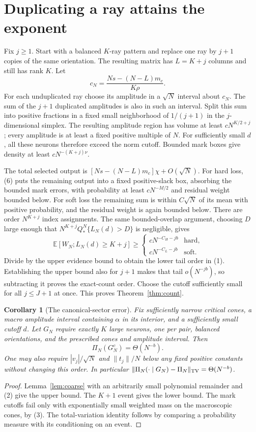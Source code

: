 \documentclass[11pt]{article}
\newtheorem{corollary}[theorem]{Corollary}
\newcommand{\E}{\mathbb E}\newcommand{\Pp}{\mathbb P}
\begin{document}
\section{Duplicating a ray attains the exponent}
Fix $j\ge1$. Start with a balanced $K$-ray pattern and replace one ray
by $j+1$ copies of the same orientation. The resulting matrix has
$L=K+j$ columns and still has rank $K$. Let
\[
                       c_N=\frac{Ns-(N-L)m_c}{K\rho}.
\]
For each unduplicated ray choose its amplitude in a $\sqrt N$ interval
about $c_N$. The sum of the $j+1$ duplicated amplitudes is also in such
an interval. Split this sum into positive fractions in a fixed small
neighborhood of $1/(j+1)$ in the $j$-dimensional simplex. The resulting
amplitude region has volume at least $cN^{K/2+j}$; every amplitude is
at least a fixed positive multiple of $N$. For sufficiently small $d$,
all these neurons therefore exceed the norm cutoff. Bounded mark boxes
give density at least $cN^{-(K+j)\nu}$.

The total selected output is $[Ns-(N-L)m_c]\chi+O(\sqrt N)$.
For hard loss, (6) puts the remaining output into a fixed positive-slack
box, absorbing the bounded mark errors, with probability at least
$cN^{-M/2}$ and residual weight bounded below. For soft loss the
remaining sum is within $C\sqrt N$ of its mean with positive probability,
and the residual weight is again bounded below. There are order
$N^{K+j}$ index assignments. The same bounded-overlap argument, choosing
$D$ large enough that $N^{K+j}Q_*^N\{L_N(d)>D\}$ is negligible, gives
\[
 \E[W_N;L_N(d)\ge K+j]\ge
 \begin{cases}cN^{-C_H-jb}&\text{hard},\\cN^{-C_L-jb}&\text{soft}.
 \end{cases}                                             \tag{14}
\]
Divide by the upper evidence bound to obtain the lower tail order in
(1). Establishing the upper bound also for $j+1$ makes that tail
$o(N^{-jb})$, so subtracting it proves the exact-count order. Choose
the cutoff sufficiently small for all $j\le J+1$ at once. This proves
Theorem~\ref{thm:count}.

\begin{corollary}[The canonical-sector error]\label{cor:sector}
Fix sufficiently narrow critical cones, a macro amplitude interval
containing $\alpha$ in its interior, and a sufficiently small cutoff $d$.
Let $G_N$ require exactly $K$ large neurons, one per pair, balanced
orientations, and the prescribed cones and amplitude interval. Then
\[
                         \Pi_N(G_N^c)=\Theta(N^{-b}).     \tag{15}
\]
One may also require $|v_j|/\sqrt N$ and $\|t_j\|/N$ below any fixed
positive constants without changing this order. In particular
$\|\Pi_N(\cdot\mid G_N)-\Pi_N\|_{\rm TV}=\Theta(N^{-b})$.
\end{corollary}
\begin{proof}
Lemma~\ref{lem:coarse} with an arbitrarily small polynomial remainder
and (2) give the upper bound. The $K+1$ event gives the lower bound.
The mark cutoffs fail only with exponentially small weighted mass on
the macroscopic cones, by (3). The total-variation identity follows by
comparing a probability measure with its conditioning on an event.
\end{proof}
\end{document}
